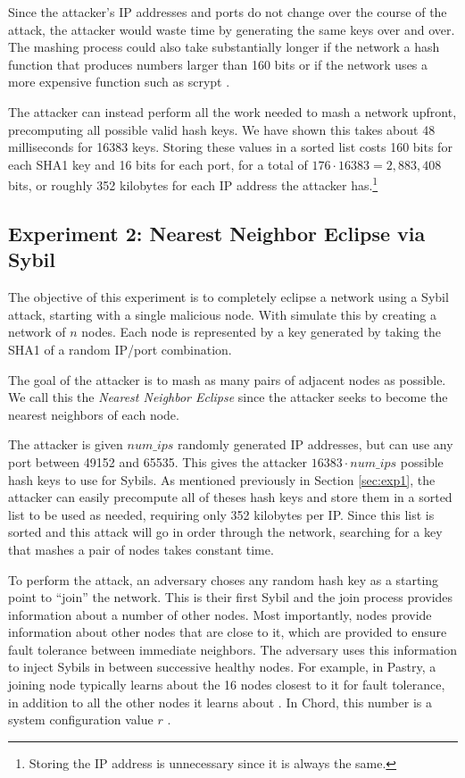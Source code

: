 \documentclass[11pt,conference]{IEEEtran}
\begin{document}
Since the attacker's IP addresses and ports do not change over the course of the attack, the attacker would waste time by generating the same keys over and over. 
The mashing process could also take substantially longer if the network a hash function that produces numbers larger than 160 bits or if the network uses a more expensive function such as scrypt \cite{scrypt}.

The attacker can instead perform all the work needed to mash a network upfront, precomputing all possible valid hash keys.
We have shown this takes about 48 milliseconds for 16383 keys.
Storing these values in a sorted list costs 160 bits for each SHA1 key and 16 bits for each port, for a total of $176  \cdot 16383 = 2,883,408$ bits, or roughly 352 kilobytes for each IP address the attacker has.\footnote{Storing the IP address is unnecessary since it is always the same.}




\subsection{Experiment 2:  Nearest Neighbor Eclipse via Sybil} %
\label{sec:exp2}
The objective of this experiment is to completely eclipse a network using a Sybil attack, starting with a single malicious node.
With simulate this by creating a network of $n$ nodes.
Each node is represented by a key generated by taking the SHA1 of a random IP/port combination.

The goal of the attacker is to mash as many pairs of adjacent nodes as possible.
We call this the \textit{Nearest Neighbor Eclipse} since the attacker seeks to become the nearest neighbors of each node.

The attacker is given $num\_ips$ randomly generated IP addresses, but can use any port between 49152 and 65535.
This gives the attacker $ 16383 \cdot num\_ips $ possible hash keys to use for Sybils.
As mentioned previously in Section \ref{sec:exp1}, the attacker can easily precompute all of theses hash keys and store them in a sorted list to be used as needed, requiring only 352 kilobytes per IP.
Since this list is sorted and this attack will go in order through the network, searching for a key that mashes a pair of nodes takes constant time.

To perform the attack, an adversary choses any random hash key as a starting point to ``join'' the network.
This is their first Sybil and the join process provides information about a number of other nodes.
Most importantly, nodes provide information about other nodes that are close to it, which are provided to ensure fault tolerance between immediate neighbors.
The adversary uses this information to inject Sybils in between successive healthy nodes.
For example, in Pastry, a joining node typically learns about the 16 nodes closest to it for fault tolerance, in addition to all the other nodes it learns about  \cite{pastry}.
In Chord, this number is a system configuration value $r$ \cite{chord}.  %
\end{document}
